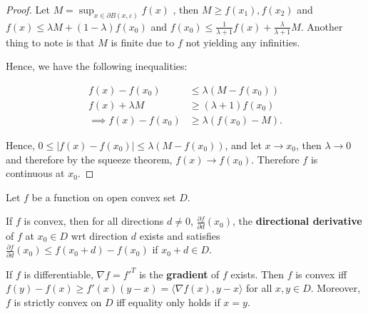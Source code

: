 \begin{proof}
  Let \( M = \sup_{x \in \partial B(x, \varepsilon)} f(x) \) , then \( M \ge
  f(x_{1}), f(x_{2}) \) and \( f(x) \le  \lambda M + (1-\lambda)f(x_{0}) \) and
  \( f(x_{0}) \le \frac{1}{\lambda+1} f(x) + \frac{\lambda}{\lambda+1} M \).
  Another thing to note is that \( M \) is finite due to \( f \) not yielding
  any infinities.

  Hence, we have the following inequalities:

  \begin{align*}
    f(x) - f(x_{0}) &\le  \lambda(M - f(x_{0}))\\
    f(x) + \lambda M &\ge (\lambda + 1) f(x_{0})\\
    \implies f(x) - f(x_{0}) &\ge  \lambda (f(x_{0}) - M)
  .\end{align*}

  Hence, \( 0 \le  |f(x) - f(x_{0})| \le  \lambda (M-f(x_{0})) \), and let \( x \to
  x_{0} \), then \( \lambda \to  0 \) and therefore by the squeeze theorem, \(
  f(x) \to  f(x_{0}) \). Therefore \( f \) is continuous at \( x_{0} \).
\end{proof}

\begin{theorem}
  Let \( f \) be a function on open convex set \( D \).

  If \( f \) is convex, then for all directions \( d \neq  0 \),
  \( \frac{\partial f}{\partial d}(x_{0})  \), the
  \textbf{directional derivative} of \( f \) at \( x_{0} \in D \) wrt direction
  \( d \) exists and satisfies \( \frac{\partial f}{\partial d} (x_{0}) \le f(x_{0} + d) -
  f(x_{0}) \) if \( x_{0} + d \in D \).

  If \( f \) is differentiable, \( \nabla f = f'^{T} \) is the \textbf{gradient}
  of \( f \) exists. Then \( f \) is convex iff \( f(y)-f(x) \ge f'(x)(y-x)
   = \langle \nabla f(x), y -x\rangle\) for all \( x,y\in D \). Moreover, \( f
   \) is strictly convex on \( D \) iff equality only holds if \( x = y \).
\end{theorem}

